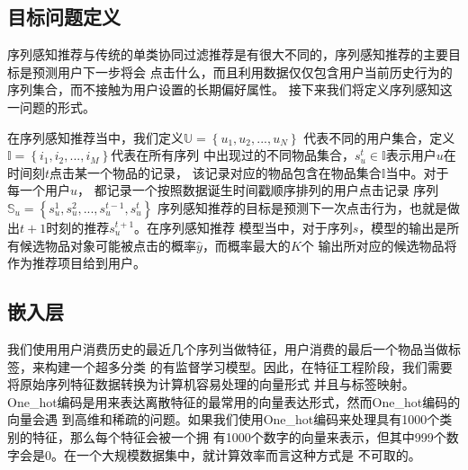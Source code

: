 \subsection{目标问题定义}

序列感知推荐与传统的单类协同过滤推荐是有很大不同的，序列感知推荐的主要目标是预测用户下一步将会%
点击什么，而且利用数据仅仅包含用户当前历史行为的序列集合，而不接触为用户设置的长期偏好属性。%
接下来我们将定义序列感知这一问题的形式。%

在序列感知推荐当中，我们定义$\mathbb{U}= \left \{ u_{1},u_{2},...,u_{N} \right \}\label{eq}$%
代表不同的用户集合，定义$\mathbb{I}= \left \{ i_{1},i_{2},...,i_{M} \right \}$代表在所有序列%
中出现过的不同物品集合，$s_{u}^{t}\in \mathbb{I}$表示用户$u$在时间刻$t$点击某一个物品的记录，%
该记录对应的物品包含在物品集合$\mathbb{I}$当中。对于每一个用户$u$，%
都记录一个按照数据诞生时间戳顺序排列的用户点击记录%
序列$\mathbb{S}_{u}=\left \{ s_{u}^{1},s_{u}^{2},...,s_{u}^{t-1},s_{u}^{t} \right \}$%
序列感知推荐的目标是预测下一次点击行为，也就是做出$t+1$时刻的推荐$s_{u}^{t+1}$。在序列感知推荐%
模型当中，对于序列$s$，模型的输出是所有候选物品对象可能被点击的概率$\hat{y}$，而概率最大的$K$个%
输出所对应的候选物品将作为推荐项目给到用户。%
%
%
%
%

\subsection{嵌入层}

我们使用用户消费历史的最近几个序列当做特征，用户消费的最后一个物品当做标签，来构建一个超多分类%
的有监督学习模型。因此，在特征工程阶段，我们需要将原始序列特征数据转换为计算机容易处理的向量形式%
并且与标签映射。One\_hot编码是用来表达离散特征的最常用的向量表达形式，然而One\_hot编码的向量会遇%
到高维和稀疏的问题。如果我们使用One\_hot编码来处理具有1000个类别的特征，那么每个特征会被一个拥%
有1000个数字的向量来表示，但其中999个数字会是0。在一个大规模数据集中，就计算效率而言这种方式是%
不可取的。

